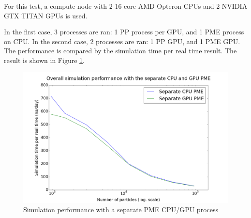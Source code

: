 \documentclass[12pt,a4paper,notitlepage]{report}
\begin{document}


    
\iffalse


For this test, a compute node with 2 16-core AMD Opteron CPUs and 2 NVIDIA GTX TITAN GPUs is used.

In the first case, 3 processes are ran: 1 PP process per GPU, and 1 PME process on CPU. In the second case, 2 processes are ran: 1 PP GPU, and 1 PME GPU. The performance is compared by the simulation time per real time result. The result is shown in Figure \ref{fig:sepGPU}.


\FloatBarrier
\begin{figure} [h!]
    \centering
    \includegraphics[width=1\textwidth]{pics/GPUCPU.png}
    \caption{Simulation performance with a separate PME CPU/GPU process}
    \label{fig:sepGPU}
\end{figure}
\FloatBarrier
\end{document}
